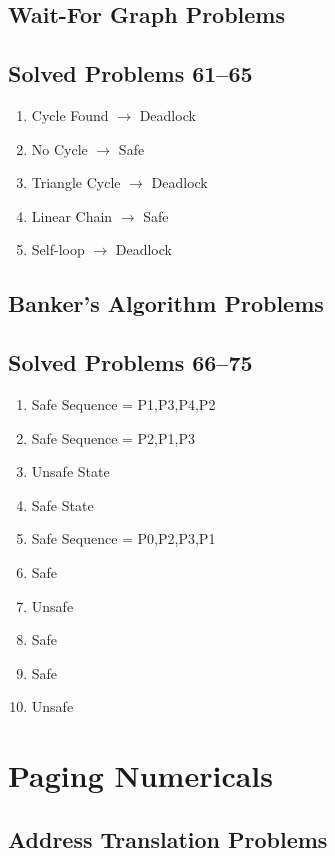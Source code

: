 \subsection{Wait-For Graph Problems}

\subsection{Solved Problems 61--65}

\begin{enumerate}
\item Cycle Found $\rightarrow$ Deadlock
\item No Cycle $\rightarrow$ Safe
\item Triangle Cycle $\rightarrow$ Deadlock
\item Linear Chain $\rightarrow$ Safe
\item Self-loop $\rightarrow$ Deadlock
\end{enumerate}

\subsection{Banker's Algorithm Problems}

\subsection{Solved Problems 66--75}

\begin{enumerate}
\item Safe Sequence = P1,P3,P4,P2
\item Safe Sequence = P2,P1,P3
\item Unsafe State
\item Safe State
\item Safe Sequence = P0,P2,P3,P1
\item Safe
\item Unsafe
\item Safe
\item Safe
\item Unsafe
\end{enumerate}

\section{Paging Numericals}

\subsection{Address Translation Problems}

